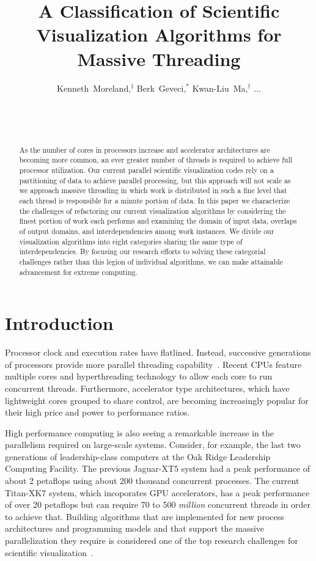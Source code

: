 \documentclass{sig-alternate}
\title{A Classification of Scientific Visualization Algorithms for Massive Threading}
\author{
  \alignauthor
  Kenneth~Moreland,$^{\ddagger}$ Berk~Geveci,$^*$ Kwan-Liu~Ma,$^{\dagger}$ ...\\
  \affaddr{$^{\ddagger}$Sandia National Laboratories}\\
  \affaddr{$^*$Kitware, Inc.}\\
  \affaddr{$^{\dagger}$University of California at Davis}\\
}
\newcommand*{\lcite}[1]{~\cite{#1}}
\begin{document}
\sloppy

\maketitle

\begin{abstract}

As the number of cores in processors increase and accelerator architectures
are becoming more common, an ever greater number of threads is required to
achieve full processor utilization. Our current parallel scientific
visualization codes rely on a partitioning of data to achieve parallel
processing, but this approach will not scale as we approach massive
threading in which work is distributed in such a fine level that each
thread is responsible for a minute portion of data. In this paper we
characterize the challenges of refactoring our current visualization
algorithms by considering the finest portion of work each performs and
examining the domain of input data, overlaps of output domains, and
interdependencies among work instances. We divide our visualization
algorithms into eight categories sharing the same type of
interdependencies. By focusing our research efforts to solving these
categorial challenges rather than this legion of individual algorithms, we
can make attainable advancement for extreme computing.

\end{abstract}

\section{Introduction}

\noindent
Processor clock and execution rates have flatlined. Instead, successive
generations of processors provide more parallel threading
capability\lcite{Sutter2005}. Recent CPUs feature multiple cores and
hyperthreading technology to allow each core to run concurrent
threads. Furthermore, accelerator type architectures, which have
lightweight cores grouped to share control, are becoming increasingly
popular for their high price and power to performance ratios.

High performance computing is also seeing a remarkable increase in the
parallelism required on large-scale systems. Consider, for example, the
last two generations of leadership-class computers at the Oak Ridge
Leadership Computing Facility. The previous Jaguar-XT5 system had a peak
performance of about 2 petaflops using about 200 thousand concurrent
processes. The current Titan-XK7 system, which incoporates GPU
accelerators, has a peak performance of over 20 petaflops but can require
70 to 500 \emph{million} concurrent threads in order to achieve
that. Building algorithms that are implemented for new process
architectures and programming models and that support the massive
parallelization they require is considered one of the top research
challenges for scientific visualization\lcite{Childs2013}.
\end{document}
